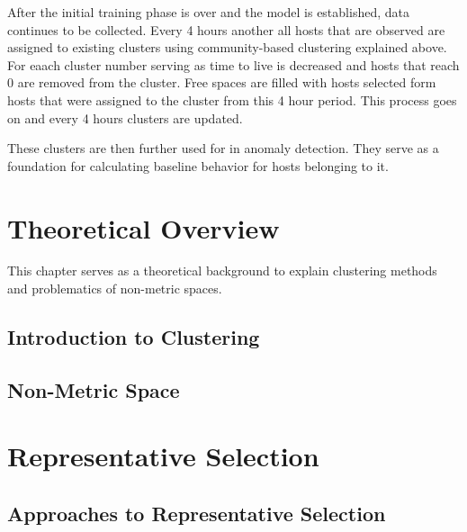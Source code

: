 \documentclass[thesis=B,english]{FITthesis}[2012/10/20]
\begin{document}
After the initial training phase is over and the model is established, data continues to be collected.
Every 4 hours another all hosts that are observed are assigned to existing clusters using community-based clustering explained above.
For eaach cluster number serving as time to live is decreased and hosts that reach 0 are removed from the cluster.
Free spaces are filled with hosts selected form hosts that were assigned to the cluster from this 4 hour period.
This process goes on and every 4 hours clusters are updated.

These clusters are then further used for in anomaly detection.
They serve as a foundation for calculating baseline behavior for hosts belonging to it.


\chapter{Theoretical Overview}

This chapter serves as a theoretical background to explain clustering methods and problematics of non-metric spaces.

\section{Introduction to Clustering}

\section{Non-Metric Space}

\chapter{Representative Selection}

\section{Approaches to Representative Selection}
\end{document}
